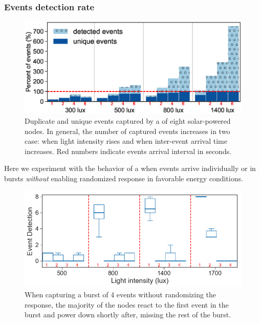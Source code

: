 \subsubsection{Events detection rate}
%
\begin{figure}[t!]
		\centering
	    \includegraphics[width=\columnwidth]{figures/regular_events_capture_rate_2.eps}
		\caption{Duplicate and unique events captured by a \fullcim of eight solar-powered nodes. In general, the number of captured events increases in two case: when light intensity rises and when inter-event arrival time increases. 
         Red numbers indicate events arrival interval in seconds.
         }
    	\label{fig:events_detection_rate}
\end{figure} 
Here we experiment with the behavior of a \cis when events arrive individually or in bursts \emph{without} enabling  randomized response in favorable energy conditions. 
%
\begin{figure}[t]
    \includegraphics[width=\columnwidth]{figures/events_burst_problem_2}
	\caption{When capturing a burst of 4 events without randomizing the response, the majority of the nodes react to the first event in the burst and power down shortly after, missing the rest of the burst.}
    \label{fig:events_burst_problem}
\end{figure}
%
